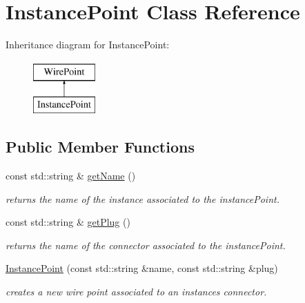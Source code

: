 \hypertarget{class_open_chams_1_1_instance_point}{}\section{Instance\+Point Class Reference}
\label{class_open_chams_1_1_instance_point}
Inheritance diagram for Instance\+Point\+:\begin{figure}[H]
\begin{center}
\leavevmode
\includegraphics[height=2.000000cm]{class_open_chams_1_1_instance_point}
\end{center}
\end{figure}
\subsection*{Public Member Functions}
\begin{DoxyCompactItemize}
\item 
\mbox{\label{class_open_chams_1_1_instance_point_a2858c0c4e8b5108f041237cf5a802029}} 
const std\+::string \& \mbox{\hyperlink{class_open_chams_1_1_instance_point_a2858c0c4e8b5108f041237cf5a802029}{get\+Name}} ()
\begin{DoxyCompactList}\small\item\em returns the name of the instance associated to the instance\+Point. \end{DoxyCompactList}\item 
\mbox{\label{class_open_chams_1_1_instance_point_a646d464666fc56ab2e04a6b87fdd3279}} 
const std\+::string \& \mbox{\hyperlink{class_open_chams_1_1_instance_point_a646d464666fc56ab2e04a6b87fdd3279}{get\+Plug}} ()
\begin{DoxyCompactList}\small\item\em returns the name of the connector associated to the instance\+Point. \end{DoxyCompactList}\item 
\mbox{\hyperlink{class_open_chams_1_1_instance_point_a1f3b6eda5ef7bb872c96f006021a61f1}{Instance\+Point}} (const std\+::string \&name, const std\+::string \&plug)
\begin{DoxyCompactList}\small\item\em creates a new wire point associated to an instance\textquotesingle{}s connector. \end{DoxyCompactList}\end{DoxyCompactItemize}


